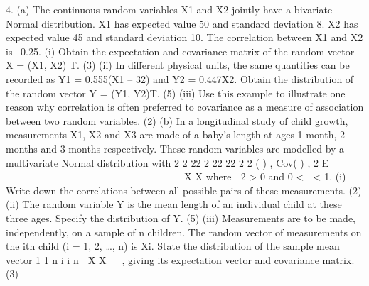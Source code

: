 4. (a) The continuous random variables X1 and X2 jointly have a bivariate Normal
distribution. X1 has expected value 50 and standard deviation 8. X2 has
expected value 45 and standard deviation 10. The correlation between X1 and
X2 is –0.25.
(i) Obtain the expectation and covariance matrix of the random vector
X = (X1, X2)
T.
(3)
(ii) In different physical units, the same quantities can be recorded as
Y1 = 0.555(X1 – 32) and Y2 = 0.447X2.
Obtain the distribution of the random vector Y = (Y1, Y2)T.
(5)
(iii) Use this example to illustrate one reason why correlation is often
preferred to covariance as a measure of association between two
random variables.
(2)
(b) In a longitudinal study of child growth, measurements X1, X2 and X3 are made
of a baby's length at ages 1 month, 2 months and 3 months respectively. These
random variables are modelled by a multivariate Normal distribution with
2 2 22
2 22
22 2 2
( ) , Cov( ) ,
2
E
   
    
    
                
X X
where  2 > 0 and 0 <  < 1.
(i) Write down the correlations between all possible pairs of these
measurements.
(2)
(ii) The random variable Y is the mean length of an individual child at these
three ages. Specify the distribution of Y.
(5)
(iii) Measurements are to be made, independently, on a sample of n
children. The random vector of measurements on the ith child (i = 1, 2,
…, n) is Xi. State the distribution of the sample mean vector
1
1 n
i
i n 
X X   , giving its expectation vector and covariance matrix.
(3) 
